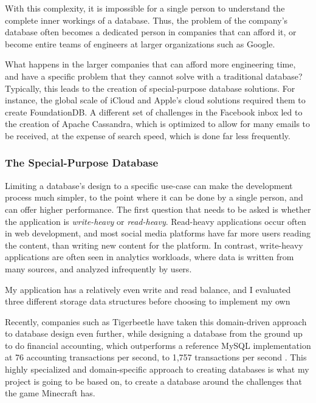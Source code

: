 \documentclass[10pt,twocolumn]{article}
\begin{document}
With this complexity, it is impossible for a single person to understand the
complete inner workings of a database. Thus, the problem of the company's
database often becomes a dedicated person in companies that can afford it, or
become entire teams of engineers at larger organizations such as
Google\cite{googlePerfTeam}.

What happens in the larger companies that can afford more engineering time, and
have a specific problem that they cannot solve with a traditional database?
Typically, this leads to the creation of special-purpose database solutions. For
instance, the global scale of iCloud and Apple's cloud solutions required them
to create FoundationDB\cite{zhou2021foundationdb}. A different set of challenges
in the Facebook inbox led to the creation of Apache
Cassandra\cite{lakshman2010cassandra}, which is optimized to allow for many
emails to be received, at the expense of search speed, which is done far less
frequently.

\subsubsection{The Special-Purpose Database}

Limiting a database's design to a specific use-case can make the development
process much simpler, to the point where it can be done by a single person, and
can offer higher performance. The first question that needs to be asked is
whether the application is \textit{write-heavy} or \textit{read-heavy}.
Read-heavy applications occur often in web development, and most social media
platforms have far more users reading the content, than writing new content for
the platform. In contrast, write-heavy applications are often seen in analytics
workloads, where data is written from many sources, and analyzed infrequently by
users.

My application has a relatively even write and read balance, and I evaluated
three different storage data structures before choosing to implement my own

Recently, companies such as Tigerbeetle\cite{tigerbeetleDesign} have taken this
domain-driven approach to database design even further, while designing a
database from the ground up to do financial accounting, which outperforms a
reference MySQL implementation at 76 accounting transactions per second, to
1,757 transactions per second \cite{tigerbeetlePerf}. This highly specialized
and domain-specific approach to creating databases is what my project is going
to be based on, to create a database around the challenges that the game
Minecraft has.
\end{document}

